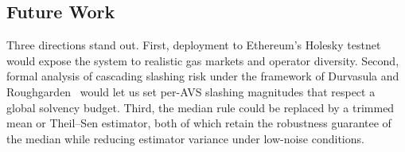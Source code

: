 \subsection{Future Work}

Three directions stand out.  First, deployment to Ethereum's Holesky
testnet would expose the system to realistic gas markets and operator
diversity.  Second, formal analysis of cascading slashing risk under
the framework of Durvasula and Roughgarden~\cite{durvasula2024robust}
would let us set per-AVS slashing magnitudes that respect a global
solvency budget.  Third, the median rule could be replaced by a
trimmed mean or Theil--Sen estimator, both of which retain the
robustness guarantee of the median while reducing
estimator variance under low-noise conditions.
